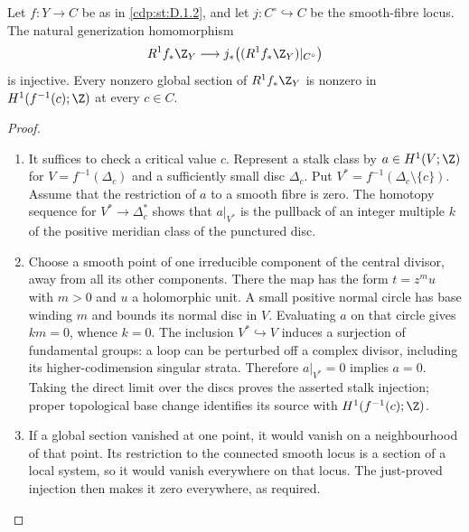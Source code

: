 \begin{proposition}\hypertarget{tag-01G6}{}\label{cdp:st:D.1.8}

Let $f:Y\to C$ be as in \ref{cdp:st:D.1.2}, and let $j:C^\circ\hookrightarrow C$
be the smooth-fibre locus. The natural generization homomorphism
\[
R^1f_*\Z_Y\longrightarrow
j_*\bigl((R^1f_*\Z_Y)|_{C^\circ}\bigr)
\]
is injective. Every nonzero global section of $R^1f_*\Z_Y$ is
nonzero in $H^1(f^{-1}(c);\Z)$ at every $c\in C$.
\end{proposition}


\begin{proof}

\begin{enumerate}[leftmargin=*]
\item It suffices to check a critical value $c$. Represent a stalk class
by $a\in H^1(V;\Z)$ for $V=f^{-1}(\Delta_c)$ and a sufficiently
small disc $\Delta_c$. Put $V^*=f^{-1}(\Delta_c\setminus\{c\})$.
Assume that the restriction of $a$ to a smooth fibre is zero.
The homotopy sequence for $V^*\to\Delta_c^*$ shows that
$a|_{V^*}$ is the pullback of an integer multiple $k$ of the
positive meridian class of the punctured disc.

\item Choose a smooth point of one irreducible component of the central
divisor, away from all its other components. There the map has
the form $t=z^m u$ with $m>0$ and $u$ a holomorphic unit.
A small positive normal circle has base winding $m$ and bounds
its normal disc in $V$. Evaluating $a$ on that circle gives
$km=0$, whence $k=0$.
The inclusion $V^*\hookrightarrow V$ induces a surjection of
fundamental groups: a loop can be perturbed off a complex divisor,
including its higher-codimension singular strata. Therefore
$a|_{V^*}=0$ implies $a=0$.
Taking the direct limit over the discs proves the asserted stalk
injection; proper topological base change identifies its source
with $H^1(f^{-1}(c);\Z)$.

\item If a global section vanished at one point, it would vanish on a
neighbourhood of that point. Its restriction to the connected
smooth locus is a section of a local system, so it would vanish
everywhere on that locus. The just-proved injection then makes
it zero everywhere, as required.

\end{enumerate}
\end{proof}